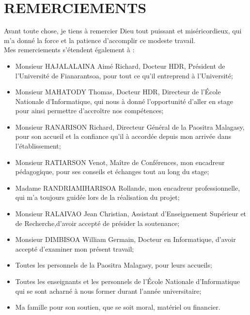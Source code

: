 \documentclass[12pt]{report}
\begin{document}
			\chapter*{REMERCIEMENTS}
			\begin{center}
				\begin{minipage}{\textwidth}
					\hspace{15pt} Avant toute chose, je tiens à remercier Dieu tout puissant et miséricordieux, qui m'a donné la force et la patience d'accomplir ce modeste travail.\\[0.5cm]
					Mes remerciements s’étendent également à :
					\begin{itemize}
						\item Monsieur HAJALALAINA Aimé Richard, Docteur HDR, Président de l'Université de Fianarantsoa, pour tout ce qu'il entreprend à l'Université;
						\item Monsieur MAHATODY Thomas, Docteur HDR, Directeur de l’École Nationale d'Informatique, qui nous à donné l'opportunité d'aller en stage pour ainsi permettre d’accroître nos compétences;
						\item Monsieur RANARISON Richard, Directeur Général de la Paositra Malagasy, pour son accueil et la confiance qu'il à accordée depuis mon arrivée dans l’établissement;
						\item Monsieur RATIARSON Venot, Maître de Conférences, mon encadreur pédagogique, pour ses conseils et échanges tout au long du stage;
						\item Madame RANDRIAMIHARISOA Rollande, mon encadreur professionnelle, qui m'a toujours guidée lors de la réalisation du projet;
						\item Monsieur RALAIVAO Jean Christian, Assistant d'Enseignement Supérieur et de Recherche,d’avoir accepté de présider la soutenance;
					 	\item Monsieur DIMBISOA William Germain, Docteur en Informatique, d'avoir accepté d'examiner mon présent travail;
						\item Toutes les personnels de la Paositra Malagasy, pour leurs accueils;
						\item Toutes les enseignants et les personnels de l’École Nationale d'Informatique qui se sont acharné à nous former durant l'année universitaire;
						\item Ma famille pour son soutien, que se soit moral, matériel ou financier.
					\end{itemize}
				\end{minipage}
			\end{center}
			\newpage
			\listoffigures
			\newpage
			\listoftables
			\newpage
\end{document}
